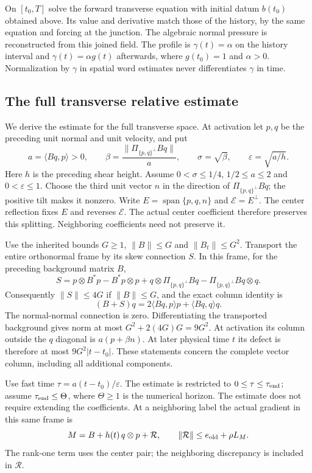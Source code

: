 \documentclass[11pt]{article}
\theoremstyle{definition}
\begin{document}
On $[t_0,T]$ solve the forward transverse equation with initial
datum $b(t_0)$ obtained above. Its value and derivative match those of
the history, by the same equation and forcing at the junction.
The algebraic normal pressure is reconstructed from this joined field.
The profile is $\gamma(t)=\alpha$ on the history interval and
$\gamma(t)=\alpha g(t)$ afterwards, where $g(t_0)=1$ and $\alpha>0$.
Normalization by $\gamma$ in spatial word estimates never differentiates
$\gamma$ in time.

\subsection{The full transverse relative estimate}
\label{subsec:full-transverse-relative}

We derive the estimate for the full transverse space. At activation
let $p,q$ be the preceding unit normal and unit velocity, and put
\[
 a=\langle Bq,p\rangle>0,\qquad
 \beta=\frac{\|\Pi_{\{p,q\}^{\perp}}Bq\|}{a},\qquad
 \sigma=\sqrt\beta,\qquad \varepsilon=\sqrt{a/h}.
\]
Here $h$ is the preceding shear height. Assume $0<\sigma\leq1/4$,
$1/2\leq a\leq2$ and $0<\varepsilon\leq1$.
Choose the third unit vector $n$ in the direction of
$\Pi_{\{p,q\}^{\perp}}Bq$; the positive tilt makes it nonzero.
Write $E=\operatorname{span}\{p,q,n\}$ and
$\mathcal E=E^\perp$. The center reflection fixes $E$ and reverses
$\mathcal E$. The actual center coefficient therefore preserves this
splitting. Neighboring coefficients need not preserve it.

Use the inherited bounds $G\geq1$, $\|B\|\leq G$ and
$\|B_t\|\leq G^2$. Transport the entire orthonormal frame by its skew
connection $S$. In this frame, for the preceding background matrix $B$,
\[
 S=p\otimes B^*p-B^*p\otimes p+
       q\otimes\Pi_{\{p,q\}^{\perp}}Bq
       -\Pi_{\{p,q\}^{\perp}}Bq\otimes q .
\]
Consequently $\|S\|\leq4G$ if $\|B\|\leq G$, and the exact column identity is
\begin{equation}\label{eq:full-connection-column}
 (B+S)q=2\langle Bq,p\rangle p+\langle Bq,q\rangle q.
\end{equation}
The normal-normal connection is zero. Differentiating the transported
background gives norm at most $G^2+2(4G)G=9G^2$.
At activation its column outside the $q$ diagonal is
$a(p+\beta n)$. At later physical time $t$ its defect is therefore at
most $9G^2|t-t_0|$. These statements concern the complete vector column,
including all additional components.

Use fast time $\tau=a(t-t_0)/\varepsilon$. The estimate is restricted to
$0\leq\tau\leq\tau_{\rm end}$; assume
$\tau_{\rm end}\leq\Theta$, where $\Theta\geq1$ is the numerical horizon.
The estimate does not require extending the coefficients.
At a neighboring label the actual gradient in this same frame is
\[
 M=B+h(t)\,q\otimes p+\mathcal R,\qquad
 \|\mathcal R\|\leq e_{\rm old}+\rho L_M .
\]
The rank-one term uses the center pair; the neighboring discrepancy is
included in $\mathcal R$.
\end{document}
